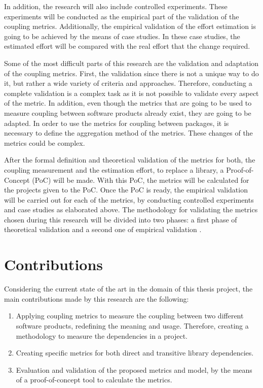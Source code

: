 \blankl
In addition, the research will also include controlled experiments. These experiments will be conducted as the empirical part of the validation of the coupling metrics. Additionally, the empirical validation of the effort estimation is going to be achieved by the means of case studies. In these case studies, the estimated effort will be compared with the real effort that the change required.

\blankl
Some of the most difficult parts of this research are the validation and adaptation of the coupling metrics.
First, the validation since there is not a unique way to do it, but rather a wide variety of criteria and approaches. Therefore, conducting a complete validation is a complex task as it is not possible to validate every aspect of the metric.
In addition, even though the metrics that are going to be used to measure coupling between software products already exist, they are going to be adapted. In order to use the metrics for coupling between packages, it is necessary to define the aggregation method of the metrics. These changes of the metrics could be complex.

\blankl
After the formal definition and theoretical validation of the metrics for both, the coupling measurement and the estimation effort, to replace a library, a Proof-of-Concept (PoC) will be made. With this PoC, the metrics will be calculated for the projects given to the PoC. Once the PoC is ready, the empirical validation will be carried out for each of the metrics, by conducting controlled experiments and case studies as elaborated above.
The methodology for validating the metrics chosen during this research will be divided into two phases: a first phase of theoretical validation and a second one of empirical validation \cite{srinivasan2014software}.

\section{Contributions}
Considering the current state of the art in the domain of this thesis project, the main contributions made by this research are the following:

\begin{enumerate}
	\item Applying coupling metrics to measure the coupling between two different software products, redefining the meaning and usage. Therefore, creating a methodology to measure the dependencies in a project.
  \blankls

	\item Creating specific metrics for both direct and transitive library dependencies.\blankls

	\item Evaluation and validation of the proposed metrics and model, by the means of a proof-of-concept tool to calculate the metrics.
\end{enumerate}

